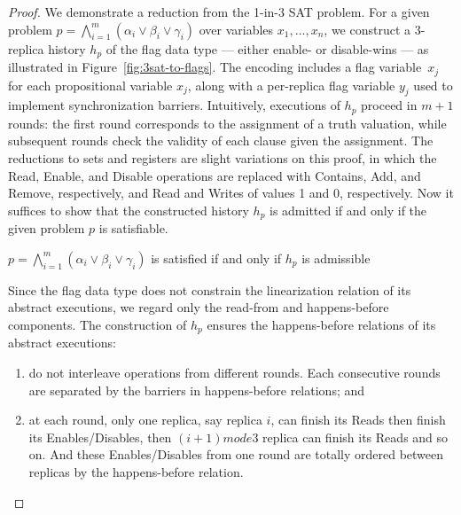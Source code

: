 \begin{proof}

  We demonstrate a reduction from the 1-in-3 SAT problem. For a given problem $p = \bigwedge_{i=1}^{m} (\alpha_i \lor \beta_i \lor \gamma_i)$ over variables $x_1, \ldots, x_n$, we construct a 3-replica history $h_p$ of the flag data type — either enable- or disable-wins — as illustrated in Figure~\ref{fig:3sat-to-flags}. The encoding includes a flag variable~$x_j$ for each propositional variable $x_j$, along with a per-replica flag variable $y_j$ used to implement synchronization barriers. Intuitively, executions of $h_p$ proceed in $m+1$ rounds: the first round corresponds to the assignment of a truth valuation, while subsequent rounds check the validity of each clause given the assignment. The reductions to sets and registers are slight variations on this proof, in which the \textrm{Read}, \textrm{Enable}, and \textrm{Disable} operations are replaced with \textrm{Contains}, \textrm{Add}, and \textrm{Remove}, respectively, and \textrm{Read} and \textrm{Writes} of values 1 and 0, respectively. Now it suffices to show that the constructed history $h_p$ is admitted if and only if the given problem $p$ is satisfiable.
  
  \begin{lemma}
    \label{crdt:flag:npc-proof:lemma3}
    $p = \bigwedge_{i=1}^{m} (\alpha_i \lor \beta_i \lor \gamma_i)$ is satisfied if and only if $h_p$ is admissible
  \end{lemma}
  
  Since the flag data type does not constrain the linearization relation of its abstract executions, we regard only the read-from and happens-before components. The construction of $h_p$ ensures the happens-before relations of its abstract executions:
  \vspace{-1.5mm}
  \begin{enumerate}

    \item do not interleave operations from different rounds. Each consecutive rounds are separated by the barriers in happens-before relations; and

    \item at each round, only one replica, say replica $i$, can finish its \textrm{Read}s then finish its \textrm{Enable}s/\textrm{Disable}s, then $(i+1) mode 3$ replica can finish its \textrm{Read}s and so on. And these \textrm{Enable}s/\textrm{Disable}s from one round are totally ordered between replicas by the happens-before relation.


\end{enumerate}
\end{proof}
